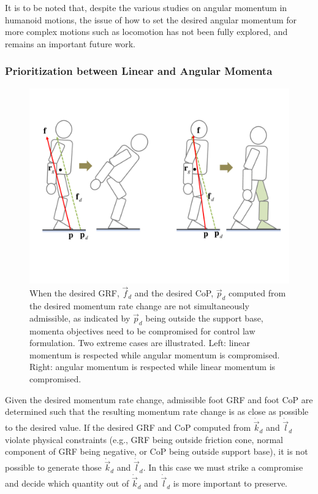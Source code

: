 \documentclass{llncs}
\newcommand{\vp}{\vec{p}}
\newcommand{\vf}{\vec{f}}
\newcommand{\vdk} {\dot{\vec{k}}}
\newcommand{\vdl} {\dot{\vec{l}}}
\begin{document}
It is to be noted that, despite the various studies on angular momentum in humanoid motions,
the issue of how to set the desired angular momentum for more complex motions such as locomotion has not been fully explored, and remains an important
future work.

\subsubsection{Prioritization between Linear and Angular Momenta}
\label{sec:prioritization}

\begin{figure}[h]
\begin{center}
\includegraphics[width = 0.6\columnwidth]{Figures/two_cases_new.pdf}
\end{center}
\caption{
When the desired GRF, $\vf_d$ and the desired CoP, $\vp_d$ computed from
the desired momentum rate change are not simultaneously admissible,
as indicated by $\vp_d$ being outside the support base,
momenta objectives need to be compromised for control law formulation.
Two extreme cases are illustrated.
Left: linear momentum is respected while angular momentum is compromised.
Right: angular momentum is respected while linear momentum is compromised.
}
\label{fig:two_cases}
\end{figure}

Given the desired momentum rate change, 
admissible foot GRF and foot CoP are determined such that the resulting momentum
rate change is as close as possible to the desired value.
If the desired GRF and CoP computed from $\vdk_d$ and $\vdl_d$
violate physical constraints (e.g., GRF being outside friction cone,
normal component of GRF being negative, or CoP being
outside support base), it is not possible
to generate those $\vdk_d$ and $\vdl_d$. In this case we must strike
a compromise and decide which quantity out of $\vdk_d$ and $\vdl_d$ is more
important to preserve.
\end{document}
